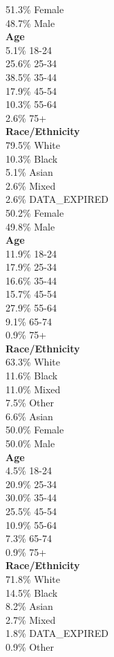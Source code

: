 51.3\% Female \\
48.7\% Male \\

\textbf{Age} \\
5.1\% 18-24 \\
25.6\% 25-34 \\
38.5\% 35-44 \\
17.9\% 45-54 \\
10.3\% 55-64 \\
2.6\% 75+ \\

\textbf{Race/Ethnicity} \\
79.5\% White \\
10.3\% Black \\
5.1\% Asian \\
2.6\% Mixed \\
2.6\% DATA_EXPIRED \\

50.2\% Female \\
49.8\% Male \\

\textbf{Age} \\
11.9\% 18-24 \\
17.9\% 25-34 \\
16.6\% 35-44 \\
15.7\% 45-54 \\
27.9\% 55-64 \\
9.1\% 65-74 \\
0.9\% 75+ \\

\textbf{Race/Ethnicity} \\
63.3\% White \\
11.6\% Black \\
11.0\% Mixed \\
7.5\% Other \\
6.6\% Asian \\

50.0\% Female \\
50.0\% Male \\

\textbf{Age} \\
4.5\% 18-24 \\
20.9\% 25-34 \\
30.0\% 35-44 \\
25.5\% 45-54 \\
10.9\% 55-64 \\
7.3\% 65-74 \\
0.9\% 75+ \\

\textbf{Race/Ethnicity} \\
71.8\% White \\
14.5\% Black \\
8.2\% Asian \\
2.7\% Mixed \\
1.8\% DATA_EXPIRED \\
0.9\% Other \\

